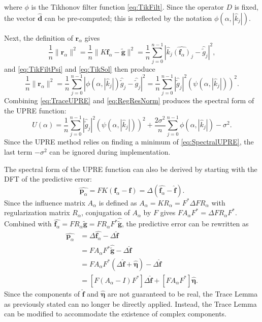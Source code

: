 \documentclass[12pt,notitlepage]{report}
\newcommand{\gnoise}{\widetilde{g}}	%
\newcommand{\gnoiseVec}{\widetilde{\mathbf{g}}}	%
\newcommand{\kMat}{K}	%
\newcommand{\fVec}{\mathbf{f}}	%
\newcommand{\dVec}{\mathbf{d}}	%
\newcommand{\ctrans}{*}	%
\newcommand{\dft}[1]{\widehat{#1}}	%
\newcommand{\regparam}{\alpha}
\newcommand{\R}{R_{\regparam}}	%
\newcommand{\regf}{\fVec_{\regparam}}	%
\newcommand{\filt}{\phi}
\newcommand{\mfilt}{\psi}
\newcommand{\noise}{\eta}	%
\newcommand{\noiseSD}{\sigma}	%
\newcommand{\noiseVec}{\bm{\noise}}	%
\newcommand{\PE}{\mathbf{p}_{\regparam}}	%
\newcommand{\regres}{\mathbf{r}_{\regparam}}	%
\newcommand{\A}{A_{\regparam}}	%
\newcommand{\U}{U}	%
\begin{document}
where $\filt$ is the Tikhonov filter function \eqref{eq:TikFilt}. Since the operator $D$ is fixed, the vector $\widehat{\dVec}$ can be pre-computed; this is reflected by the notation $\filt(\regparam,|\widehat{k}_j|)$. \par
Next, the definition of $\regres$ gives
\[\frac{1}{n}\|\regres\|^2 = \frac{1}{n}\|\kMat\regf - \gnoiseVec\|^2 = \frac{1}{n}\sum_{j = 0}^{n-1} |\widehat{k}_j\widehat{(\regf)}_j - \widehat{\gnoise}_j|^2,\]
and \eqref{eq:TikFiltPsi} and \eqref{eq:TikSol} then produce
\begin{equation}
\frac{1}{n}\|\regres\|^2 = \frac{1}{n}\sum_{j = 0}^{n-1} |\filt(\regparam,|\widehat{k}_j|)\widehat{\gnoise}_j - \widehat{\gnoise}_j|^2 = \frac{1}{n}\sum_{j = 0}^{n-1} |\widehat{\gnoise}_j|^2(\mfilt(\regparam,|\widehat{k}_j|))^2.
\label{eq:RegResNorm}
\end{equation}
Combining \eqref{eq:TraceUPRE} and \eqref{eq:RegResNorm} produces the spectral form of the UPRE function:
\begin{equation}
\U(\regparam) = \frac{1}{n}\sum_{j = 0}^{n-1} |\widehat{\gnoise}_j|^2(\mfilt(\regparam,|\widehat{k}_j|))^2 + \frac{2\noiseSD^2}{n}\sum_{j = 0}^{n-1} \filt(\regparam,|\widehat{k}_j|) - \noiseSD^2.
\label{eq:SpectralUPRE}
\end{equation} 
Since the UPRE method relies on finding a minimum of \eqref{eq:SpectralUPRE}, the last term $-\noiseSD^2$ can be ignored during implementation. \par
The spectral form of the UPRE function can also be derived by starting with the DFT of the predictive error:
\[\dft{\PE} = F\kMat(\regf - \fVec) = \Delta(\dft{\regf} - \dft{\fVec}).\]
Since the influence matrix $\A$ is defined as $\A = \kMat\R = F^\ctrans\Delta{F}\R$ with regularization matrix $\R$, conjugation of $\A$ by $F$ gives $F\A{F^\ctrans} = \Delta{F}\R{F^\ctrans}$. Combined with $\dft{\regf} = F\R\gnoiseVec = F\R{F^\ctrans}\dft{\gnoiseVec}$, the predictive error can be rewritten as
\begin{align*}
\dft{\PE} &= \Delta\dft{\regf} - \Delta\dft{\fVec} \\
&= F\A{F^\ctrans}\dft{\gnoiseVec} - \Delta\dft{\fVec} \\
&= F\A{F^\ctrans}(\Delta\dft{\fVec} + \dft{\noiseVec}) - \Delta\dft{\fVec} \\
&= [F(\A - I)F^\ctrans]\Delta\dft{\fVec} + [F\A{F^\ctrans}]\dft{\noiseVec}.
\end{align*}
Since the components of $\dft{\fVec}$ and $\dft{\noiseVec}$ are not guaranteed to be real, the Trace Lemma as previously stated can no longer be directly applied. Instead, the Trace Lemma can be modified to accommodate the existence of complex components.
\end{document}
